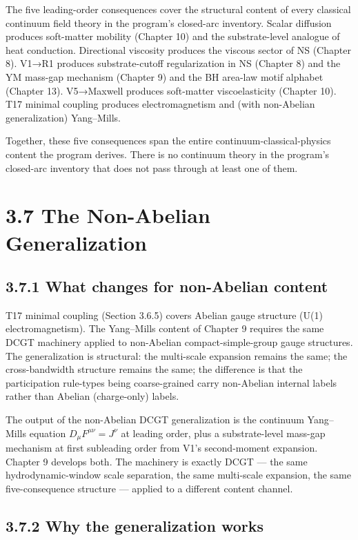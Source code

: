 \documentclass[11pt]{book}
\begin{document}
The five leading-order consequences cover the structural content of every classical continuum field theory in the program's closed-arc inventory. Scalar diffusion produces soft-matter mobility (Chapter 10) and the substrate-level analogue of heat conduction. Directional viscosity produces the viscous sector of NS (Chapter 8). V1→R1 produces substrate-cutoff regularization in NS (Chapter 8) and the YM mass-gap mechanism (Chapter 9) and the BH area-law motif alphabet (Chapter 13). V5→Maxwell produces soft-matter viscoelasticity (Chapter 10). T17 minimal coupling produces electromagnetism and (with non-Abelian generalization) Yang–Mills.

Together, these five consequences span the entire continuum-classical-physics content the program derives. There is no continuum theory in the program's closed-arc inventory that does not pass through at least one of them.

\section{3.7 The Non-Abelian Generalization}

\subsection{3.7.1 What changes for non-Abelian content}

T17 minimal coupling (Section 3.6.5) covers Abelian gauge structure (U(1) electromagnetism). The Yang–Mills content of Chapter 9 requires the same DCGT machinery applied to non-Abelian compact-simple-group gauge structures. The generalization is structural: the multi-scale expansion remains the same; the cross-bandwidth structure remains the same; the difference is that the participation rule-types being coarse-grained carry non-Abelian internal labels rather than Abelian (charge-only) labels.

The output of the non-Abelian DCGT generalization is the continuum Yang–Mills equation $D_\mu F^{\mu\nu} = J^\nu$ at leading order, plus a substrate-level mass-gap mechanism at first subleading order from V1's second-moment expansion. Chapter 9 develops both. The machinery is exactly DCGT — the same hydrodynamic-window scale separation, the same multi-scale expansion, the same five-consequence structure — applied to a different content channel.

\subsection{3.7.2 Why the generalization works}
\end{document}
